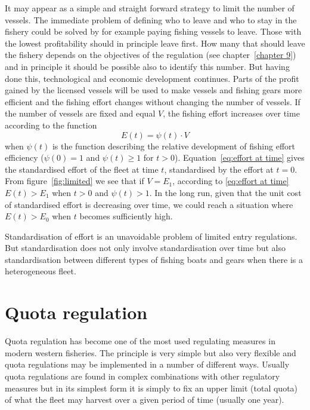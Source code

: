\documentclass[11pt,fleqn]{book} %
\begin{document}
It may appear as a simple and straight forward strategy to limit the number of vessels. The immediate problem of defining who to leave and who to stay in the fishery could be solved by for example paying fishing vessels to leave. Those with the lowest profitability should in principle leave first. How many that should leave the fishery depends on the objectives of the regulation (see chapter~\ref{chapter 9}) and in principle it should be possible also to identify this number. But having done this, technological and economic development continues. Parts of the profit gained by the licensed vessels will be used to make vessels and fishing gears more efficient and the fishing effort changes without changing the number of vessels. If the number of vessels are fixed and equal $V$, the fishing effort increases over time according to the function
\begin{equation} 
\label{eq:effort at time}
  E(t) = \psi(t) \cdot V
\end{equation}
when $\psi(t)$ is the function describing the relative development of fishing effort efficiency ($\psi(0) = 1$ and $\psi(t) \geq 1$ for $t>0$). Equation~\ref{eq:effort at time} gives the standardised effort of the fleet at time $t$, standardised by the effort at $t=0$. From figure~\ref{fig:limited} we see that if $V = E_1$, according to \ref{eq:effort at time} $E(t) > E_1$ when $t>0$ and $\psi(t) > 1$. In the long run, given that the unit cost of standardised effort is decreasing over time, we could reach a situation where $E(t) > E_0$ when $t$ becomes sufficiently high.

Standardisation of effort is an unavoidable problem of limited entry regulations. But standardisation does not only involve standardisation over time but also standardisation between different types of fishing boats and gears when there is a heterogeneous fleet.

\section{Quota regulation}

Quota regulation has become one of the most used regulating measures in modern western fisheries. The principle is very simple but also very flexible and quota regulations may be implemented in a number of different ways. Usually quota regulations are found in complex combinations with other regulatory measures but in its simplest form it is simply to fix an upper limit (total quota) of what the fleet may harvest over a given period of time (usually one year).
\end{document}

